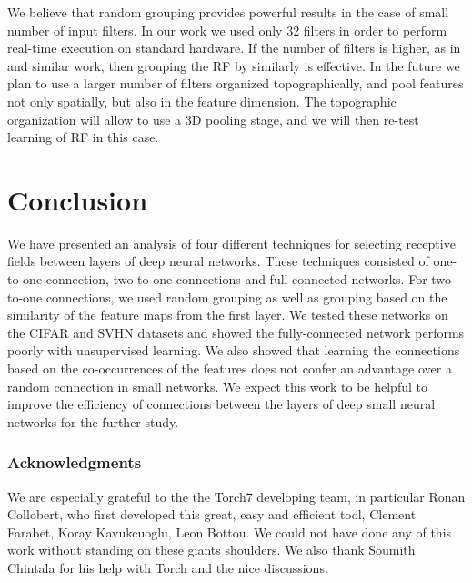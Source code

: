 \documentclass{article} %
\begin{document}
We believe that random grouping provides powerful results in the case of small number of input filters. In our work we used only 32 filters in order to perform real-time execution on standard hardware. If the number of filters is higher, as in  \cite{coates2012learning} and similar work, then grouping the RF by similarly is effective. In the future we plan to use a larger number of filters organized topographically, and pool features not only spatially, but also in the feature dimension. The topographic organization will allow to use a 3D pooling stage, and we will then re-test learning of RF in this case.


\section{Conclusion}
\label{sec-conc}

We have presented an analysis of four different techniques for selecting receptive fields between layers of deep neural networks.
These techniques consisted of one-to-one connection, two-to-one connections and full-connected networks.
For two-to-one connections, we used random grouping as well as grouping based on the similarity of the feature maps from the first layer.  We tested these networks on the CIFAR and SVHN datasets and showed the fully-connected network performs poorly with unsupervised learning. We also showed that learning the connections based on the co-occurrences of  the features does not confer an advantage over a random connection in small networks.
We expect this work to be helpful to improve the efficiency of connections between the layers of deep small neural networks for the further study.


\subsubsection*{Acknowledgments}
We are especially grateful to the the Torch7 developing team, in particular Ronan Collobert, who first developed this great, easy and efficient tool,
Clement Farabet, Koray Kavukcuoglu, Leon Bottou.
We could not have done any of this work without standing on these giants shoulders.
We also thank Soumith Chintala for his help with Torch and the nice discussions.



\end{document}
